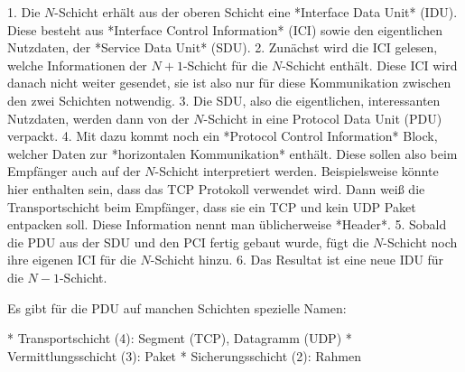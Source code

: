 \documentclass[a4paper,11pt]{scrartcl}
\begin{document}
1. Die $N$-Schicht erhält aus der oberen Schicht eine *Interface Data Unit*
   (IDU). Diese besteht aus *Interface Control Information* (ICI) sowie den
   eigentlichen Nutzdaten, der *Service Data Unit* (SDU).
2. Zunächst wird die ICI gelesen, welche Informationen der $N+1$-Schicht für die
   $N$-Schicht enthält. Diese ICI wird danach nicht weiter gesendet, sie ist
   also nur für diese Kommunikation zwischen den zwei Schichten notwendig.
3. Die SDU, also die eigentlichen, interessanten Nutzdaten, werden dann von der
   $N$-Schicht in eine Protocol Data Unit (PDU) verpackt.
4. Mit dazu kommt noch ein *Protocol Control Information* Block,
welcher Daten zur *horizontalen Kommunikation* enthält. Diese sollen also beim
Empfänger auch auf der $N$-Schicht interpretiert werden. Beispielsweise könnte
hier enthalten sein, dass das TCP Protokoll verwendet wird. Dann weiß die
Transportschicht beim Empfänger, dass sie ein TCP und kein UDP Paket entpacken
soll. Diese Information nennt man üblicherweise *Header*.
5. Sobald die PDU aus der SDU und den PCI fertig gebaut wurde, fügt die
   $N$-Schicht noch ihre eigenen ICI für die $N$-Schicht hinzu.
6. Das Resultat ist eine neue IDU für die $N-1$-Schicht.

Es gibt für die PDU auf manchen Schichten spezielle Namen:

* Transportschicht (4): Segment (TCP), Datagramm (UDP)
* Vermittlungsschicht (3): Paket
* Sicherungsschicht (2): Rahmen




%
%
%
%
\end{document}
